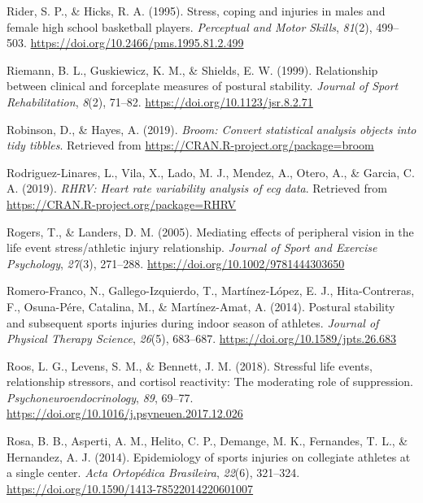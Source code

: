 \documentclass[man,floatsintext]{apa6}
\begin{document}
\leavevmode\hypertarget{ref-Rider1995}{}%
Rider, S. P., \& Hicks, R. A. (1995). Stress, coping and injuries in males and female high school basketball players. \emph{Perceptual and Motor Skills}, \emph{81}(2), 499--503. \url{https://doi.org/10.2466/pms.1995.81.2.499}

\leavevmode\hypertarget{ref-Riemann1999d}{}%
Riemann, B. L., Guskiewicz, K. M., \& Shields, E. W. (1999). Relationship between clinical and forceplate measures of postural stability. \emph{Journal of Sport Rehabilitation}, \emph{8}(2), 71--82. \url{https://doi.org/10.1123/jsr.8.2.71}

\leavevmode\hypertarget{ref-R-broom}{}%
Robinson, D., \& Hayes, A. (2019). \emph{Broom: Convert statistical analysis objects into tidy tibbles}. Retrieved from \url{https://CRAN.R-project.org/package=broom}

\leavevmode\hypertarget{ref-Rodriguez-Linares2017}{}%
Rodriguez-Linares, L., Vila, X., Lado, M. J., Mendez, A., Otero, A., \& Garcia, C. A. (2019). \emph{RHRV: Heart rate variability analysis of ecg data}. Retrieved from \url{https://CRAN.R-project.org/package=RHRV}

\leavevmode\hypertarget{ref-Rogers2005}{}%
Rogers, T., \& Landers, D. M. (2005). Mediating effects of peripheral vision in the life event stress/athletic injury relationship. \emph{Journal of Sport and Exercise Psychology}, \emph{27}(3), 271--288. \url{https://doi.org/10.1002/9781444303650}

\leavevmode\hypertarget{ref-Romero-Franco2014}{}%
Romero-Franco, N., Gallego-Izquierdo, T., Martínez-López, E. J., Hita-Contreras, F., Osuna-Pére, Catalina, M., \& Martínez-Amat, A. (2014). Postural stability and subsequent sports injuries during indoor season of athletes. \emph{Journal of Physical Therapy Science}, \emph{26}(5), 683--687. \url{https://doi.org/10.1589/jpts.26.683}

\leavevmode\hypertarget{ref-Roos2018}{}%
Roos, L. G., Levens, S. M., \& Bennett, J. M. (2018). Stressful life events, relationship stressors, and cortisol reactivity: The moderating role of suppression. \emph{Psychoneuroendocrinology}, \emph{89}, 69--77. \url{https://doi.org/10.1016/j.psyneuen.2017.12.026}

\leavevmode\hypertarget{ref-Rosa2014}{}%
Rosa, B. B., Asperti, A. M., Helito, C. P., Demange, M. K., Fernandes, T. L., \& Hernandez, A. J. (2014). Epidemiology of sports injuries on collegiate athletes at a single center. \emph{Acta Ortopédica Brasileira}, \emph{22}(6), 321--324. \url{https://doi.org/10.1590/1413-78522014220601007}
\end{document}

